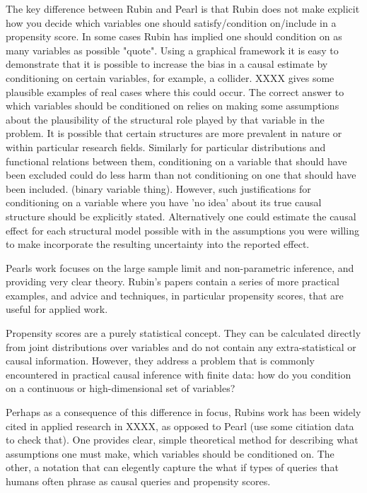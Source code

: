 \documentclass[11pt,a4paper]{article}
\begin{document}
The key difference between Rubin and Pearl is that Rubin does not make explicit how you decide which variables one should satisfy/condition on/include in a propensity score. In some cases Rubin has implied one should condition on as many variables as possible "quote". Using a graphical framework it is easy to demonstrate that it is possible to increase the bias in a causal estimate by conditioning on certain variables, for example, a collider.  XXXX gives some plausible examples of real cases where this could occur. The correct answer to which variables should be conditioned on relies on making some assumptions about the plausibility of the structural role played by that variable in the problem. It is possible that certain structures are more prevalent in nature or within particular research fields. Similarly for particular distributions and functional relations between them, conditioning on a variable that should have been excluded could do less harm than not conditioning on one that should have been included. (binary variable thing). However, such justifications for conditioning on a variable where you have 'no idea' about its true causal structure should be explicitly stated. Alternatively one could estimate the causal effect for each structural model possible with in the assumptions you were willing to make incorporate the resulting uncertainty into the reported effect.   

Pearls work focuses on the large sample limit and non-parametric inference, and providing very clear theory. Rubin's papers contain a series of more practical examples, and advice and techniques, in particular propensity scores, that are useful for applied work.

Propensity scores are a purely statistical concept. They can be calculated directly from joint distributions over variables and do not contain any extra-statistical or causal information. However, they address a problem that is commonly encountered in practical causal inference with finite data: how do you condition on a continuous or high-dimensional set of variables? 

Perhaps as a consequence of this difference in focus, Rubins work has been widely cited in applied research in XXXX, as opposed to Pearl (use some citiation data to check that). One provides clear, simple theoretical method for describing what assumptions one must make, which variables should be conditioned on. The other, a notation that can elegently capture the what if types of queries that humans often phrase as causal queries and propensity scores.
\end{document}
